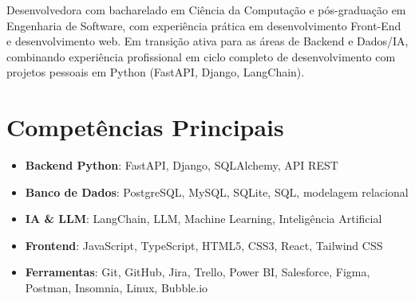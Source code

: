 \documentclass[11pt,a4paper,sans]{moderncv}
\begin{document}
\makecvtitle


\vspace{6pt}
\small{Desenvolvedora com bacharelado em Ciência da Computação e pós-graduação em Engenharia de Software, com experiência prática em desenvolvimento Front-End e desenvolvimento web. Em transição ativa para as áreas de Backend e Dados/IA, combinando experiência profissional em ciclo completo de desenvolvimento com projetos pessoais em Python (FastAPI, Django, LangChain).}


\section{Competências Principais}
\vspace{1pt}
\begin{itemize}

\item \textbf{Backend Python}: FastAPI, Django, SQLAlchemy, API REST

\item \textbf{Banco de Dados}: PostgreSQL, MySQL, SQLite, SQL, modelagem relacional

\item \textbf{IA \& LLM}: LangChain, LLM, Machine Learning, Inteligência Artificial

\item \textbf{Frontend}: JavaScript, TypeScript, HTML5, CSS3, React, Tailwind CSS

\item \textbf{Ferramentas}: Git, GitHub, Jira, Trello, Power BI, Salesforce, Figma, Postman, Insomnia, Linux, Bubble.io

\end{itemize}

\end{document}
